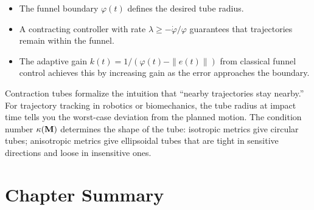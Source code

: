 \begin{itemize}
\item The funnel boundary $\varphi(t)$ defines the desired tube radius.
\item A contracting controller with rate $\lambda \geq -\dot\varphi / \varphi$
      guarantees that trajectories remain within the funnel.
\item The adaptive gain $k(t) = 1/(\varphi(t) - \|e(t)\|)$ from classical funnel
      control achieves this by increasing gain as the error approaches the boundary.
\end{itemize}

\begin{intuitionbox}
Contraction tubes formalize the intuition that ``nearby trajectories stay nearby.''
For trajectory tracking in robotics or biomechanics, the tube radius at impact time
tells you the worst-case deviation from the planned motion. The condition number
$\kappa(\mathbf{M})$ determines the shape of the tube: isotropic metrics give circular
tubes; anisotropic metrics give ellipsoidal tubes that are tight in sensitive directions
and loose in insensitive ones.
\end{intuitionbox}


\section{Chapter Summary}

